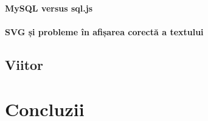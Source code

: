\documentclass[12pt, a4paper, twoside, romanian]{teza-upb}
\begin{document}
      \subsubsection{MySQL versus sql.js} %
      \label{ssub:MySQL versus sql.js}

      \subsubsection{SVG și probleme în afișarea corectă a textului}
      \label{subsubsec:svg-problems}

  \section{Viitor}
  \chapter{Concluzii}



\appendix
\end{document}
